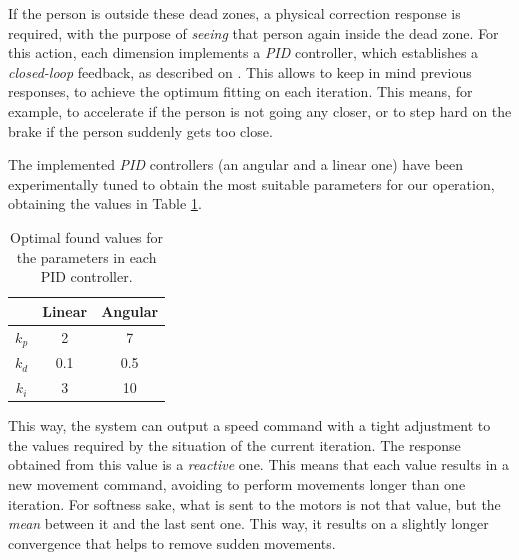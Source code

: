 If the person is outside these dead zones, a physical correction response is required, with the purpose of \emph{seeing} that person again inside the dead zone. For this action, each dimension implements a \emph{PID} controller, which establishes a \emph{closed-loop} feedback, as described on \cite{pid-controller}. This allows to keep in mind previous responses, to achieve the optimum fitting on each iteration. This means, for example, to accelerate if the person is not going any closer, or to step hard on the brake if the person suddenly gets too close.

The implemented \emph{PID} controllers (an angular and a linear one) have been experimentally tuned to obtain the most suitable parameters for our operation, obtaining the values in Table \ref{tab:pids}.

\begin{table}[h]
	\centering
	\begin{tabular}{|c|c|c|}
		\hline
		\textbf{} & \textbf{Linear} & \textbf{Angular} \\ \hline
		$k_p$     & 2               & 7                \\ \hline
		$k_d$     & 0.1             & 0.5              \\ \hline
		$k_i$     & 3               & 10               \\ \hline
	\end{tabular}
	\caption{Optimal found values for the parameters in each PID controller.}
	\label{tab:pids}
\end{table}

This way, the system can output a speed command with a tight adjustment to the values required by the situation of the current iteration. The response obtained from this value is a \emph{reactive} one. This means that each value results in a new movement command, avoiding to perform movements longer than one iteration. For softness sake, what is sent to the motors is not that value, but the \emph{mean} between it and the last sent one. This way, it results on a slightly longer convergence that helps to remove sudden movements.


